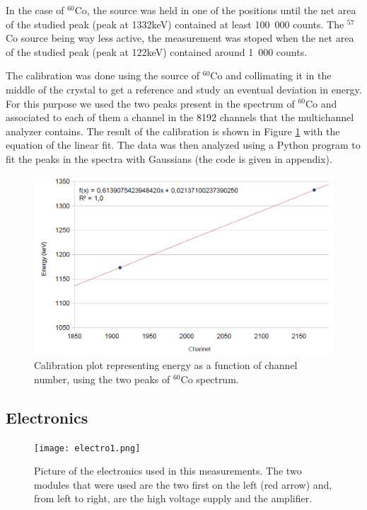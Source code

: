 \documentclass[11pt,a4paper]{article}
\begin{document}
In the case of $^{60}$Co, the source was held in one of the positions until the net area of the studied peak (peak at 1332keV) contained at least 100~000 counts. The $^{57}$Co source being way less active, the measurement was stoped when the net area of the studied peak (peak at 122keV) contained around 1~000 counts.

The calibration was done using the source of $^{60}$Co and collimating it in the middle of the crystal to get a reference and study an eventual deviation in energy. For this purpose we used the two peaks present in the spectrum of $^{60}$Co and associated to each of them a channel in the 8192 channels that the multichannel analyzer contains. The result of the calibration is shown in Figure \ref{calib} with the equation of the linear fit. The data was then analyzed using a Python program to fit the peaks in the spectra with Gaussians (the code is given in appendix).

\begin{figure}[!h]
\centering
\includegraphics[scale=0.6]{calibration.png}
\caption{Calibration plot representing energy as a function of channel number, using the two peaks of $^{60}$Co spectrum.}
\label{calib}
\end{figure}

\subsection{Electronics}

\begin{figure}[!h]
\centering
\texttt{[image: electro1.png]}
\caption{Picture of the electronics used in this measurements. The two modules that were used are the two first on the left (red arrow) and, from left to right, are the high voltage supply and the amplifier.}
\label{electro1}
\end{figure}
\end{document}
